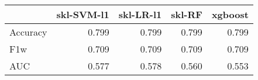 \begin{tabular}{lrrrr}
\toprule
{} &  skl-SVM-l1 &  skl-LR-l1 &  skl-RF &  xgboost \\
\midrule
Accuracy &       0.799 &      0.799 &   0.799 &    0.799 \\
F1w      &       0.709 &      0.709 &   0.709 &    0.709 \\
AUC      &       0.577 &      0.578 &   0.560 &    0.553 \\
\bottomrule
\end{tabular}
